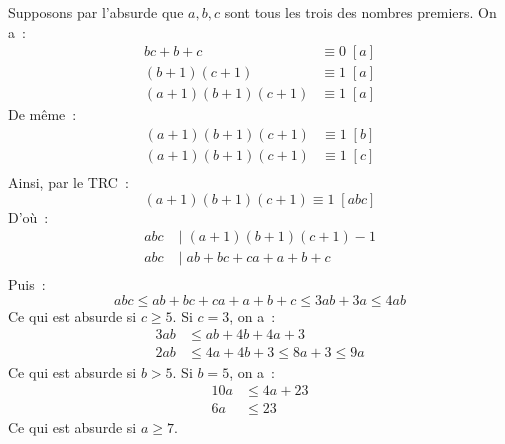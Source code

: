 \begin{sol}
	Supposons par l'absurde que $a, b, c$ sont tous les trois des nombres premiers.
	On a~:
	\begin{align*}
	bc + b + c &\equiv 0 \; [a] \\
	(b + 1)(c + 1) &\equiv 1 \; [a] \\
	(a + 1)(b + 1)(c + 1) &\equiv 1 \; [a]
	\end{align*}
	De même~:
	\begin{align*}
		(a + 1)(b + 1)(c + 1) &\equiv 1 \; [b] \\
		(a + 1)(b + 1)(c + 1) &\equiv 1 \; [c] \\
	\end{align*}
	Ainsi, par le TRC~:
	$$(a + 1)(b + 1)(c + 1) \equiv 1 \; [abc]$$
	D'où~:
	\begin{align*}
		abc &\;|\; (a + 1)(b + 1)(c + 1) - 1 \\
		abc &\;|\; ab + bc + ca + a + b + c \\
	\end{align*}
	Puis~:
	$$abc \leq ab + bc + ca + a + b + c \leq 3ab + 3a \leq 4ab$$
	Ce qui est absurde si $c \geq 5$.
	Si $c = 3$, on a~:
	\begin{align*}
	3ab &\leq ab + 4b + 4a + 3 \\
	2ab &\leq 4a + 4b + 3 \leq 8a + 3 \leq 9a
	\end{align*}
	Ce qui est absurde si $b > 5$.
	Si $b = 5$, on a~:
	\begin{align*}
		10a &\leq 4a + 23 \\
		6a &\leq 23
	\end{align*}
	Ce qui est absurde si $a \geq 7$.
\end{sol}
